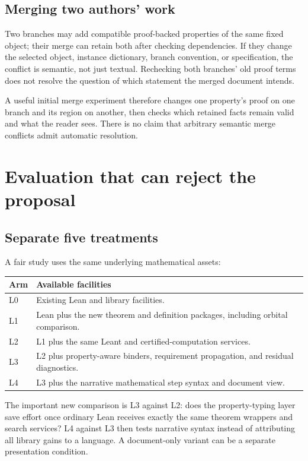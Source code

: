 \documentclass[11pt,a4paper]{article}
\theoremstyle{definition}
\begin{document}
\subsection{Merging two authors' work}
Two branches may add compatible proof-backed properties of the same fixed
object; their merge can retain both after checking dependencies. If they change
the selected object, instance dictionary, branch convention, or specification,
the conflict is semantic, not just textual. Rechecking both branches' old proof
terms does not resolve the question of which statement the merged document
intends.

A useful initial merge experiment therefore changes one property's proof on
one branch and its region on another, then checks which retained facts remain
valid and what the reader sees. There is no claim that arbitrary semantic merge
conflicts admit automatic resolution.

\section{Evaluation that can reject the proposal}\label{sec:evaluation}
\subsection{Separate five treatments}
A fair study uses the same underlying mathematical assets:
\begin{center}\small
\begin{tabularx}{\textwidth}{@{}P{15mm}Y@{}}
\toprule
Arm & Available facilities\\
\midrule
L0 & Existing Lean and library facilities.\\
L1 & Lean plus the new theorem and definition packages, including orbital comparison.\\
L2 & L1 plus the same Leant and certified-computation services.\\
L3 & L2 plus property-aware binders, requirement propagation, and residual diagnostics.\\
L4 & L3 plus the narrative mathematical step syntax and document view.\\
\bottomrule
\end{tabularx}
\end{center}

The important new comparison is L3 against L2: does the property-typing layer
save effort once ordinary Lean receives exactly the same theorem wrappers and
search services? L4 against L3 then tests narrative syntax instead of attributing
all library gains to a language. A document-only variant can be a separate
presentation condition.
\end{document}
